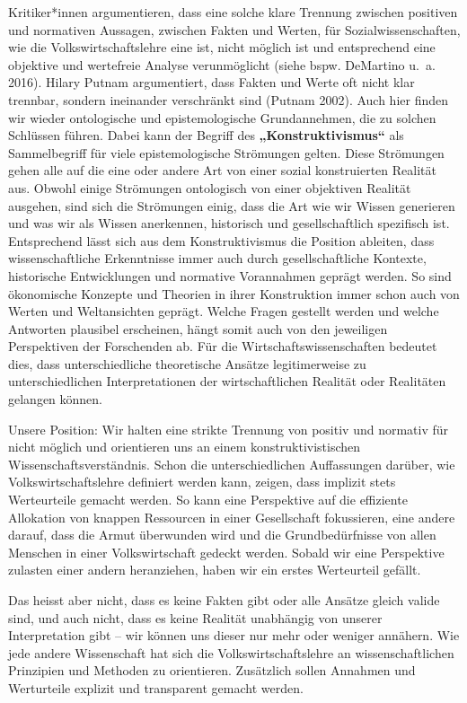 \documentclass[
  nswissgerman,
  a4paper,
  DIV=11,
  numbers=noendperiod,
  oneside,
  openany]{scrreprt}
\begin{document}
Kritiker*innen argumentieren, dass eine solche klare Trennung zwischen
positiven und normativen Aussagen, zwischen Fakten und Werten, für
Sozialwissenschaften, wie die Volkswirtschaftslehre eine ist, nicht
möglich ist und entsprechend eine objektive und wertefreie Analyse
verunmöglicht (siehe bspw. DeMartino u.~a. 2016). Hilary Putnam
argumentiert, dass Fakten und Werte oft nicht klar trennbar, sondern
ineinander verschränkt sind (Putnam 2002). Auch hier finden wir wieder
ontologische und epistemologische Grundannehmen, die zu solchen
Schlüssen führen. Dabei kann der Begriff des
\textbf{„Konstruktivismus``} als Sammelbegriff für viele
epistemologische Strömungen gelten. Diese Strömungen gehen alle auf die
eine oder andere Art von einer sozial konstruierten Realität aus. Obwohl
einige Strömungen ontologisch von einer objektiven Realität ausgehen,
sind sich die Strömungen einig, dass die Art wie wir Wissen generieren
und was wir als Wissen anerkennen, historisch und gesellschaftlich
spezifisch ist. Entsprechend lässt sich aus dem Konstruktivismus die
Position ableiten, dass wissenschaftliche Erkenntnisse immer auch durch
gesellschaftliche Kontexte, historische Entwicklungen und normative
Vorannahmen geprägt werden. So sind ökonomische Konzepte und Theorien in
ihrer Konstruktion immer schon auch von Werten und Weltansichten
geprägt. Welche Fragen gestellt werden und welche Antworten plausibel
erscheinen, hängt somit auch von den jeweiligen Perspektiven der
Forschenden ab. Für die Wirtschaftswissenschaften bedeutet dies, dass
unterschiedliche theoretische Ansätze legitimerweise zu
unterschiedlichen Interpretationen der wirtschaftlichen Realität oder
Realitäten gelangen können.

Unsere Position: Wir halten eine strikte Trennung von positiv und
normativ für nicht möglich und orientieren uns an einem
konstruktivistischen Wissenschaftsverständnis. Schon die
unterschiedlichen Auffassungen darüber, wie Volkswirtschaftslehre
definiert werden kann, zeigen, dass implizit stets Werteurteile gemacht
werden. So kann eine Perspektive auf die effiziente Allokation von
knappen Ressourcen in einer Gesellschaft fokussieren, eine andere
darauf, dass die Armut überwunden wird und die Grundbedürfnisse von
allen Menschen in einer Volkswirtschaft gedeckt werden. Sobald wir eine
Perspektive zulasten einer andern heranziehen, haben wir ein erstes
Werteurteil gefällt.

Das heisst aber nicht, dass es keine Fakten gibt oder alle Ansätze
gleich valide sind, und auch nicht, dass es keine Realität unabhängig
von unserer Interpretation gibt -- wir können uns dieser nur mehr oder
weniger annähern. Wie jede andere Wissenschaft hat sich die
Volkswirtschaftslehre an wissenschaftlichen Prinzipien und Methoden zu
orientieren. Zusätzlich sollen Annahmen und Werturteile explizit und
transparent gemacht werden.
\end{document}
